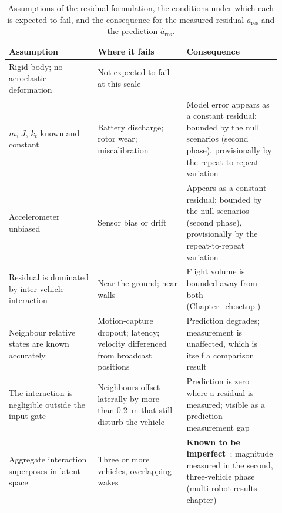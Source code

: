 \begin{table}[t]
  \centering
  \caption{Assumptions of the residual formulation, the conditions under which each is expected to
    fail, and the consequence for the measured residual $a_{\mathrm{res}}$ and the prediction
    $\hat a_{\mathrm{res}}$.}
  \label{tab:model-assumptions}
  \small
  \begin{tabular}{@{}p{0.30\linewidth}p{0.30\linewidth}p{0.32\linewidth}@{}}
    \toprule
    Assumption & Where it fails & Consequence \\
    \midrule
    Rigid body; no aeroelastic deformation
      & Not expected to fail at this scale
      & --- \\
    $m$, $J$, $k_t$ known and constant
      & Battery discharge; rotor wear; miscalibration
      & Model error appears as a constant residual; bounded by the null scenarios (second phase), provisionally by the repeat-to-repeat variation \\
    Accelerometer unbiased
      & Sensor bias or drift
      & Appears as a constant residual; bounded by the null scenarios (second phase), provisionally by the repeat-to-repeat variation \\
    Residual is dominated by inter-vehicle interaction
      & Near the ground; near walls
      & Flight volume is bounded away from both (Chapter~\ref{ch:setup}) \\
    Neighbour relative states are known accurately
      & Motion-capture dropout; latency; velocity differenced from broadcast positions
      & Prediction degrades; measurement is unaffected, which is itself a comparison result \\
    The interaction is negligible outside the input gate
      & Neighbours offset laterally by more than \SI{0.2}{\metre} that still disturb the vehicle
      & Prediction is zero where a residual is measured; visible as a prediction--measurement gap \\
    Aggregate interaction superposes in latent space
      & Three or more vehicles, overlapping wakes
      & \textbf{Known to be imperfect}~\cite{shi2020neuralswarm,gielis2023aggregate}; magnitude measured in the second, three-vehicle phase (multi-robot results chapter) \\

\end{tabular}
\end{table}
